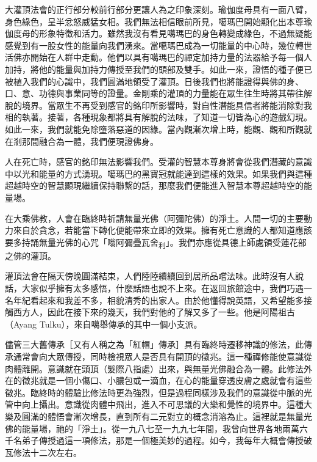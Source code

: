 大灌頂法會的正行部分較前行部分更讓人為之印象深刻。瑜伽度母具有一面八臂，身色綠色，呈半忿怒威猛女相。我們無法相信眼前所見，噶瑪巴開始顯化出本尊瑜伽度母的形象特徵和活力。雖然我沒有看見噶瑪巴的身色轉變成綠色，不過無疑能感覺到有一股女性的能量向我們湧來。當噶瑪巴成為一切能量的中心時，幾位轉世活佛亦開始在人群中走動。他們以具有噶瑪巴的禪定加持力量的法器給予每一個人加持，將他的能量與加持力傳授至我們的頭部及雙手。如此一來，證悟的種子便已被植入我們的心識中，我們圓滿地領受了灌頂。日後我們也將能證得與佛的身、口、意、功德與事業同等的證量。金剛乘的灌頂的力量能在眾生往生時將其帶往解脫的境界。當眾生不再受到感官的銘印所影響時，對自性潛能具信者將能消除對我相的執著。接著，各種現象都將具有解脫的法味，了知道一切皆為心的遊戲幻現。如此一來，我們就能免除墮落惡道的因緣。當內觀漸次增上時，能觀、觀和所觀就在剎那間融合為一體，我們便現證佛身。

人在死亡時，感官的銘印無法影響我們。受灌的智慧本尊身將會從我們潛藏的意識中以光和能量的方式湧現。噶瑪巴的黑寶冠就能達到這樣的效果。如果我們與這種超越時空的智慧顯現繼續保持聯繫的話，那麼我們便能進入智慧本尊超越時空的能量場。

在大乘佛教，人會在臨終時祈請無量光佛（阿彌陀佛）的淨土。人間一切的主要動力來自於貪念，若能當下轉化便能帶來立即的效果。擁有死亡意識的人都知道應該要多持誦無量光佛的心咒「嗡阿彌疊瓦舍\textsubscript{利}」。我們亦應從具德上師處領受蓮花部之佛的灌頂。

灌頂法會在隔天傍晚圓滿結束，人們陸陸續續回到居所品嚐法味。此時沒有人說話，大家似乎擁有太多感悟，什麼話語也說不上來。在返回旅館途中，我們巧遇一名年紀看起來和我差不多，相貌清秀的出家人。由於他懂得說英語，又希望能多接觸西方人，因此在接下來的幾天，我們對他的了解又多了一些。他是阿陽祖古（Ayang
Tulku），來自噶舉傳承的其中一個小支派。

儘管三大舊傳承［又有人稱之為「紅帽」傳承］具有臨終時遷移神識的修法，此傳承通常會向大眾傳授，同時檢視眾人是否具有開頂的徵兆。這一種禪修能使意識從肉體離開。意識就在頭頂（髮際八指處）出來，與無量光佛融合為一體。此修法外在的徵兆就是一個小傷口、小膿包或一滴血，在心的能量穿透皮膚之處就會有這些徵兆。臨終時的體驗比修法時更為強烈，但是過程同樣涉及我們的意識從中脈的光管中向上攝出。意識從肉體中飛出，進入不可思議的大樂和覺性的境界中。這種大樂及圓滿的體悟會漸次增長，直到所有二元對立的概念消溶為止。這裡就是無量光佛的能量場，祂的「淨土」。從一九八七至一九九七年間，我曾向世界各地兩萬六千名弟子傳授過這一項修法，那是一個極美妙的過程。如今，我每年大概會傳授破瓦修法十二次左右。

